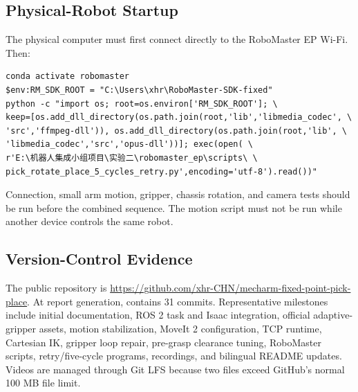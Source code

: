 \documentclass[UTF8,zihao=-4,scheme=chinese,fontset=none]{ctexart}
\newcommand{\githuburl}{\url{https://github.com/xhr-CHN/mecharm-fixed-point-pick-place}}
\begin{document}
\subsection{Physical-Robot Startup}
The physical computer must first connect directly to the RoboMaster EP Wi-Fi. Then:
\begin{lstlisting}[caption={Prepare the verified RoboMaster SDK environment}]
conda activate robomaster
$env:RM_SDK_ROOT = "C:\Users\xhr\RoboMaster-SDK-fixed"
python -c "import os; root=os.environ['RM_SDK_ROOT']; \
keep=[os.add_dll_directory(os.path.join(root,'lib','libmedia_codec', \
'src','ffmpeg-dll')), os.add_dll_directory(os.path.join(root,'lib', \
'libmedia_codec','src','opus-dll'))]; exec(open( \
r'E:\机器人集成小组项目\实验二\robomaster_ep\scripts\ \
pick_rotate_place_5_cycles_retry.py',encoding='utf-8').read())"
\end{lstlisting}
Connection, small arm motion, gripper, chassis rotation, and camera tests should be run before the combined sequence. The motion script must not be run while another device controls the same robot.

\subsection{Version-Control Evidence}
The public repository is \githuburl. At report generation,  contains 31 commits. Representative milestones include initial documentation, ROS 2 task and Isaac integration, official adaptive-gripper assets, motion stabilization, MoveIt 2 configuration, TCP runtime, Cartesian IK, gripper loop repair, pre-grasp clearance tuning, RoboMaster scripts, retry/five-cycle programs, recordings, and bilingual README updates. Videos are managed through Git LFS because two files exceed GitHub's normal 100 MB file limit.
\end{document}
